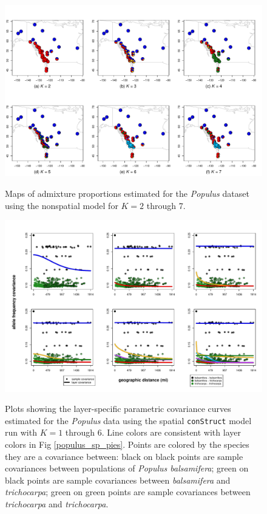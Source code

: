 \documentclass[10pt,letterpaper]{article}
\newcommand{\tri}{\textit{trichocarpa}}
\newcommand{\bals}{\textit{balsamifera}}
\begin{document}
\begin{figure}
	\centering
		{\includegraphics[width=\textwidth]{figs/populus/populus_nsp_pies.pdf}}
	\caption{
	Maps of admixture proportions estimated for the \textit{Populus} dataset 
	using the nonspatial model for $K=2$ through 7.
    }\label{populus_nsp_pies}
\end{figure}
\clearpage

\begin{figure}
	\centering
		{\includegraphics[width=\textwidth]{figs/populus/populus_sp_layer_covs.pdf}}
	\caption{
	Plots showing the layer-specific parametric covariance curves
	estimated for the \textit{Populus} data using 
	the spatial \texttt{conStruct} model run with $K=1$ through 6.
	Line colors are consistent with layer colors in Fig \ref{populus_sp_pies}.
	Points are colored by the species they are a covariance between:
	black on black points are sample covariances between populations of \textit{Populus balsamifera};
	green on black points are sample covariances between \bals{} and \tri{};
	green on green points are sample covariances between \tri{} and \tri{}.
    }\label{populus_sp_layer_covs}
\end{figure}
\clearpage
\end{document}
